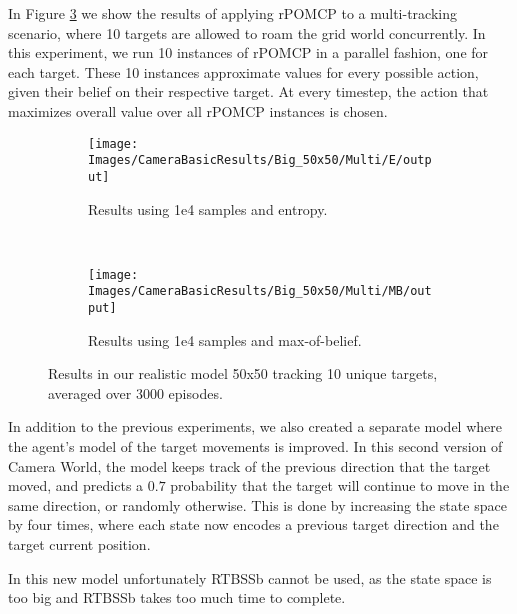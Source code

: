In Figure \ref{fig:cwb10} we show the results of applying rPOMCP to a multi-tracking scenario, where
10 targets are allowed to roam the grid world concurrently. In this experiment, we run 10 instances
of rPOMCP in a parallel fashion, one for each target. These 10 instances approximate values for
every possible action, given their belief on their respective target. At every timestep, the action that
maximizes overall value over all rPOMCP instances is chosen.

\begin{figure}[ht!]
        \centering
        \begin{subfigure}[t]{0.5\textwidth}
                \texttt{[image: Images/CameraBasicResults/Big\_50x50/Multi/E/output]}
                \caption{Results using 1e4 samples and entropy.}
                \label{fig:cwb4e10}
        \end{subfigure}%
        ~ %
        \begin{subfigure}[t]{0.5\textwidth}
                \texttt{[image: Images/CameraBasicResults/Big\_50x50/Multi/MB/output]}
                \caption{Results using 1e4 samples and max-of-belief.}
                \label{fig:cwb5mb10}
        \end{subfigure}
        \caption{Results in our realistic model 50x50 tracking 10 unique targets, averaged over 3000 episodes.}\label{fig:cwb10}
\end{figure}

In addition to the previous experiments, we also created a separate model where the agent's model of
the target movements is improved. In this second version of Camera World, the model keeps track of
the previous direction that the target moved, and predicts a $0.7$ probability that the target will
continue to move in the same direction, or randomly otherwise. This is done by increasing the state
space by four times, where each state now encodes a previous target direction and the target current
position.

In this new model unfortunately RTBSSb cannot be used, as the state space is too big and RTBSSb
takes too much time to complete.


